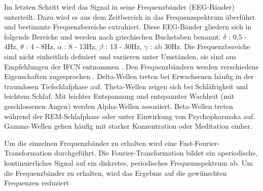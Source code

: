 Im letzten Schritt wird das Signal in seine Frequenzbänder (EEG-Bänder) unterteilt. Dazu wird es aus dem Zeitbereich in das Frequenzspektrum  überführt und bestimmte Frequenzbereiche extrahiert. Diese EEG-Bänder gliedern sich in folgende Bereiche und werden nach griechischen Buchstaben benannt: $\delta$ : 0,5 - 4Hz, $\theta$ : 4 - 8Hz, $\alpha$ : 8 - 13Hz, $\beta$ : 13 - 30Hz, $\gamma$ : ab 30Hz. Die Frequenzbereiche sind nicht einheitlich definiert und variieren unter Umständen, sie sind aus Empfehlungen der IFCN entnommen \cite{ifcn}. Den Frequenzbändern werden verschiedene Eigenschaften zugesprochen \cite{lei2011,Lv2010,Gundel1992}. Delta-Wellen treten bei Erwachsenen häufig in der traumlosen Tiefschlafphase auf. Theta-Wellen zeigen sich bei Schläfrigkeit und leichtem Schlaf. Mit leichter Entspannung und entspannter Wachheit (mit geschlossenen Augen) werden Alpha-Wellen assoziiert. Beta-Wellen treten während der REM-Schlafphase oder unter Einwirkung von Psychopharmaka auf. Gamma-Wellen gehen häufig mit starker Konzentration oder Meditation einher.

Um die einzelnen Frequenzbänder zu erhalten wird eine Fast-Fourier-Transformation \cite{Bochner_1} durchgeführt. \wavelet
 Die Fourier-Transformation bildet ein aperiodische, kontinuierliches Signal auf ein diskretes, periodisches Frequenzspektrum ab. Um die Frequenzbänder zu erhalten, wird das Ergebnis auf die gewünschten Frequenzen reduziert\fftExample
